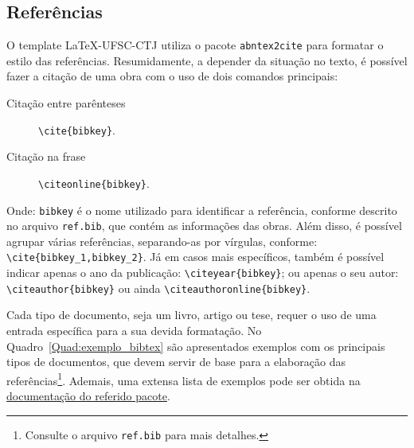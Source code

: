 \documentclass[
	12pt,				%
	oneside,			%
	a4paper,			%
	chapter=TITLE,		%
	section=TITLE,		%
	english,			%
	brazil,				%
	]{abntex2}
\begin{document}
\begin{apendicesenv}
    \subsection{Referências}
    \label{Sec:ref_biblio}

    O template \LaTeX-UFSC-CTJ utiliza o pacote \texttt{abntex2cite} para formatar o estilo das referências.
    Resumidamente, a depender da situação no texto, é possível fazer a citação de uma obra com o uso de dois comandos principais:
    \begin{description}
        \item[Citação entre parênteses] \verb|\cite{bibkey}|.
        \item[Citação na frase] \verb|\citeonline{bibkey}|.
    \end{description}
    Onde: \verb|bibkey| é o nome utilizado para identificar a referência, conforme descrito no arquivo \texttt{ref.bib}, que contém as informações das obras.
    Além disso, é possível agrupar várias referências, separando-as por vírgulas, conforme: \verb|\cite{bibkey_1,bibkey_2}|.
    Já em casos mais específicos, também é possível indicar apenas o ano da publicação: \verb|\citeyear{bibkey}|; ou apenas o seu autor: \verb|\citeauthor{bibkey}| ou ainda \verb|\citeauthoronline{bibkey}|.

    Cada tipo de documento, seja um livro, artigo ou tese, requer o uso de uma entrada específica para a sua devida formatação.
    No Quadro~\ref{Quad:exemplo_bibtex} são apresentados exemplos com os principais tipos de documentos, que devem servir de base para a elaboração das referências\footnote{Consulte o arquivo \texttt{ref.bib} para mais detalhes.}.
    Ademais, uma extensa lista de exemplos pode ser obtida na \href{http://tug.ctan.org/macros/latex/contrib/abntex2/doc/abntex2cite.pdf}{documentação do referido pacote}.


\end{apendicesenv}
\end{document}
